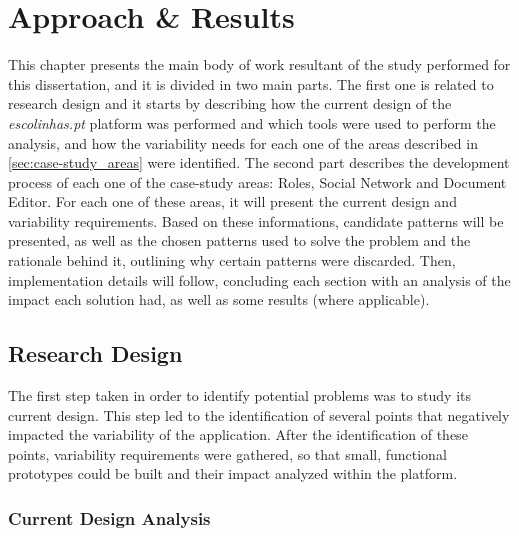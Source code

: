 \chapter{Approach \& Results}\label{chap:approach_results}

This chapter presents the main body of work resultant of the study performed for this dissertation, and it is divided in two main parts. The first one is related to research design and it starts by describing how the current design of the \emph{escolinhas.pt} platform was performed and which tools were used to perform the analysis, and how the variability needs for each one of the areas described in \ref{sec:case-study_areas} were identified. The second part describes the development process of each one of the case-study areas: Roles, Social Network and Document Editor. For each one of these areas, it will present the current design and variability requirements. Based on these informations, candidate patterns will be presented, as well as the chosen patterns used to solve the problem and the rationale behind it, outlining why certain patterns were discarded. Then, implementation details will follow, concluding each section with an analysis of the impact each solution had, as well as some results (where applicable).

\section{Research Design}\label{sec:research_design}

The first step taken in order to identify potential problems was to study its current design. This step led to the identification of several points that negatively impacted the variability of the application. After the identification of these points, variability requirements were gathered, so that small, functional prototypes could be built and their impact analyzed within the platform.

\subsection{Current Design Analysis}\label{sec:current_design_analysis}

